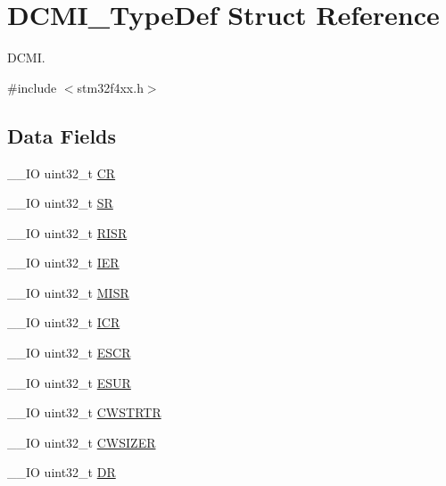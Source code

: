 \hypertarget{struct_d_c_m_i___type_def}{\section{D\-C\-M\-I\-\_\-\-Type\-Def Struct Reference}
\label{struct_d_c_m_i___type_def}
}


D\-C\-M\-I.  




{\ttfamily \#include $<$stm32f4xx.\-h$>$}

\subsection*{Data Fields}
\begin{DoxyCompactItemize}
\item 
\-\_\-\-\_\-\-I\-O uint32\-\_\-t \hyperlink{struct_d_c_m_i___type_def_ab40c89c59391aaa9d9a8ec011dd0907a}{C\-R}
\item 
\-\_\-\-\_\-\-I\-O uint32\-\_\-t \hyperlink{struct_d_c_m_i___type_def_af6aca2bbd40c0fb6df7c3aebe224a360}{S\-R}
\item 
\-\_\-\-\_\-\-I\-O uint32\-\_\-t \hyperlink{struct_d_c_m_i___type_def_aa196fddf0ba7d6e3ce29bdb04eb38b94}{R\-I\-S\-R}
\item 
\-\_\-\-\_\-\-I\-O uint32\-\_\-t \hyperlink{struct_d_c_m_i___type_def_a6566f8cfbd1d8aa7e8db046aa35e77db}{I\-E\-R}
\item 
\-\_\-\-\_\-\-I\-O uint32\-\_\-t \hyperlink{struct_d_c_m_i___type_def_a524e134cec519206cb41d0545e382978}{M\-I\-S\-R}
\item 
\-\_\-\-\_\-\-I\-O uint32\-\_\-t \hyperlink{struct_d_c_m_i___type_def_a0a8c8230846fd8ff154b9fde8dfa0399}{I\-C\-R}
\item 
\-\_\-\-\_\-\-I\-O uint32\-\_\-t \hyperlink{struct_d_c_m_i___type_def_a9cc4ec74be864c929261e0810f2fd7f0}{E\-S\-C\-R}
\item 
\-\_\-\-\_\-\-I\-O uint32\-\_\-t \hyperlink{struct_d_c_m_i___type_def_af751d49ef824c1636c78822ecae066f4}{E\-S\-U\-R}
\item 
\-\_\-\-\_\-\-I\-O uint32\-\_\-t \hyperlink{struct_d_c_m_i___type_def_a919b70dd8762e44263a02dfbafc7b8ce}{C\-W\-S\-T\-R\-T\-R}
\item 
\-\_\-\-\_\-\-I\-O uint32\-\_\-t \hyperlink{struct_d_c_m_i___type_def_aa3ccc5d081bbee3c61ae9aa5e0c83af9}{C\-W\-S\-I\-Z\-E\-R}
\item 
\-\_\-\-\_\-\-I\-O uint32\-\_\-t \hyperlink{struct_d_c_m_i___type_def_a3df0d8dfcd1ec958659ffe21eb64fa94}{D\-R}
\end{DoxyCompactItemize}


